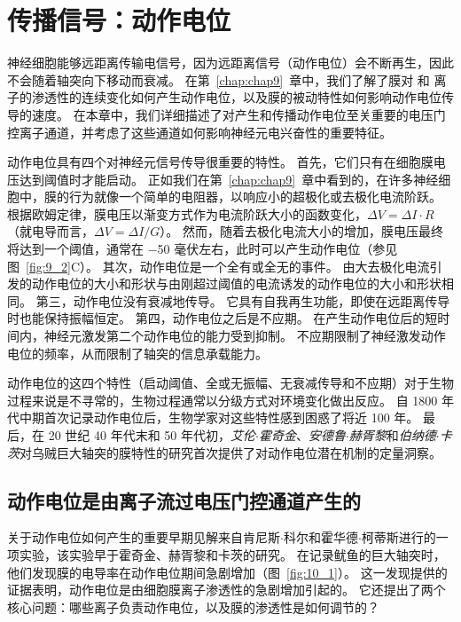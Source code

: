 \chapter{传播信号：动作电位} \label{chap:chap10}

神经细胞能够远距离传输电信号，因为远距离信号（动作电位）会不断再生，因此不会随着轴突向下移动而衰减。
在第~\ref{chap:chap9}~章中，我们了解了膜对  和  离子的渗透性的连续变化如何产生动作电位，以及膜的被动特性如何影响动作电位传导的速度。
在本章中，我们详细描述了对产生和传播动作电位至关重要的电压门控离子通道，并考虑了这些通道如何影响神经元电兴奋性的重要特征。


动作电位具有四个对神经元信号传导很重要的特性。
首先，它们只有在细胞膜电压达到阈值时才能启动。
正如我们在第~\ref{chap:chap9}~章中看到的，在许多神经细胞中，膜的行为就像一个简单的电阻器，以响应小的超极化或去极化电流阶跃。
根据欧姆定律，膜电压以渐变方式作为电流阶跃大小的函数变化，$\Delta V = \Delta I \cdot R$（就电导而言，$\Delta V = \Delta I / G$）。
然而，随着去极化电流大小的增加，膜电压最终将达到一个阈值，通常在 −50 毫伏左右，此时可以产生动作电位（参见图~\ref{fig:9_2}C）。
其次，动作电位是一个全有或全无的事件。
由大去极化电流引发的动作电位的大小和形状与由刚超过阈值的电流诱发的动作电位的大小和形状相同。
第三，动作电位没有衰减地传导。
它具有自我再生功能，即使在远距离传导时也能保持振幅恒定。
第四，动作电位之后是不应期。
在产生动作电位后的短时间内，神经元激发第二个动作电位的能力受到抑制。
不应期限制了神经激发动作电位的频率，从而限制了轴突的信息承载能力。


动作电位的这四个特性（启动阈值、全或无振幅、无衰减传导和不应期）对于生物过程来说是不寻常的，生物过程通常以分级方式对环境变化做出反应。
自 1800 年代中期首次记录动作电位后，生物学家对这些特性感到困惑了将近 100 年。
最后，在 20 世纪 40 年代末和 50 年代初，\textit{艾伦$\cdot$霍奇金}、\textit{安德鲁$\cdot$赫胥黎}和\textit{伯纳德$\cdot$卡茨}对乌贼巨大轴突的膜特性的研究首次提供了对动作电位潜在机制的定量洞察。



\section{动作电位是由离子流过电压门控通道产生的}

关于动作电位如何产生的重要早期见解来自肯尼斯$\cdot$科尔和霍华德$\cdot$柯蒂斯进行的一项实验，该实验早于霍奇金、赫胥黎和卡茨的研究。
在记录鱿鱼的巨大轴突时，他们发现膜的电导率在动作电位期间急剧增加（图~\ref{fig:10_1}）。
这一发现提供的证据表明，动作电位是由细胞膜离子渗透性的急剧增加引起的。
它还提出了两个核心问题：哪些离子负责动作电位，以及膜的渗透性是如何调节的？


